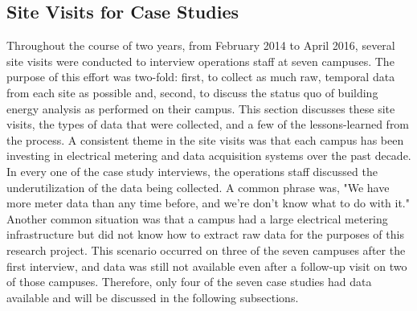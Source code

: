 \subsection{Site Visits for Case Studies}
\label{sec:sitevisit}
Throughout the course of two years, from February 2014 to April 2016, several site visits were conducted to interview operations staff at seven campuses. The purpose of this effort was two-fold: first, to collect as much raw, temporal data from each site as possible and, second, to discuss the status quo of building energy analysis as performed on their campus. This section discusses these site visits, the types of data that were collected, and a few of the lessons-learned from the process. A consistent theme in the site visits was that each campus has been investing in electrical metering and data acquisition systems over the past decade. In every one of the case study interviews, the operations staff discussed the underutilization of the data being collected. A common phrase was, "We have more meter data than any time before, and we're don't know what to do with it." Another common situation was that a campus had a large electrical metering infrastructure but did not know how to extract raw data for the purposes of this research project. This scenario occurred on three of the seven campuses after the first interview, and data was still not available even after a follow-up visit on two of those campuses. Therefore, only four of the seven case studies had data available and will be discussed in the following subsections.
